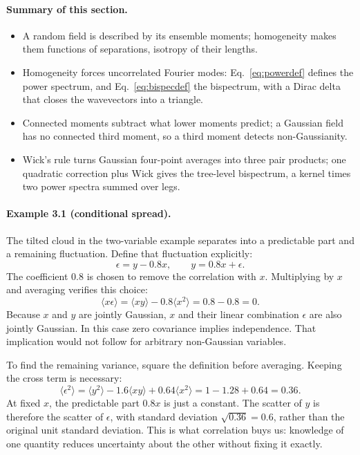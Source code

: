 \documentclass[11pt]{article}
\numberwithin{equation}{section}
\begin{document}
\paragraph{Summary of this section.}
\begin{itemize}
  \item A random field is described by its ensemble moments;
    homogeneity makes them functions of separations, isotropy of
    their lengths.
  \item Homogeneity forces uncorrelated Fourier modes:
    Eq.~\eqref{eq:powerdef} defines the power spectrum, and
    Eq.~\eqref{eq:bispecdef} the bispectrum, with a Dirac delta that
    closes the wavevectors into a triangle.
  \item Connected moments subtract what lower moments predict; a
    Gaussian field has no connected third moment, so a third moment
    detects non-Gaussianity.
  \item Wick's rule turns Gaussian four-point averages into three
    pair products; one quadratic correction plus Wick gives the
    tree-level bispectrum, a kernel times two power spectra summed
    over legs.
\end{itemize}

\paragraph{Example 3.1 (conditional spread).}
The tilted cloud in the two-variable example separates into a predictable
part and a remaining fluctuation. Define that fluctuation explicitly:
\begin{equation}
  \epsilon=y-0.8x, \qquad y=0.8x+\epsilon.
\end{equation}
The coefficient $0.8$ is chosen to remove the correlation with $x$.
Multiplying by $x$ and averaging verifies this choice:
\begin{equation}
  \langle x\epsilon\rangle
  =\langle xy\rangle-0.8\langle x^2\rangle
  =0.8-0.8=0.
\end{equation}
Because $x$ and $y$ are jointly Gaussian, $x$ and their linear
combination $\epsilon$ are also jointly Gaussian. In this case zero
covariance implies independence. That implication would not follow for
arbitrary non-Gaussian variables.

To find the remaining variance, square the definition before averaging.
Keeping the cross term is necessary:
\begin{equation}
 \langle\epsilon^2\rangle
 =\langle y^2\rangle-1.6\langle xy\rangle+0.64\langle x^2\rangle
 =1-1.28+0.64=0.36.
\end{equation}
At fixed $x$, the predictable part $0.8x$ is just a constant. The scatter
of $y$ is therefore the scatter of $\epsilon$, with standard deviation
$\sqrt{0.36}=0.6$, rather than the original unit standard deviation.
This is what correlation buys us: knowledge of one quantity reduces
uncertainty about the other without fixing it exactly.
\end{document}
